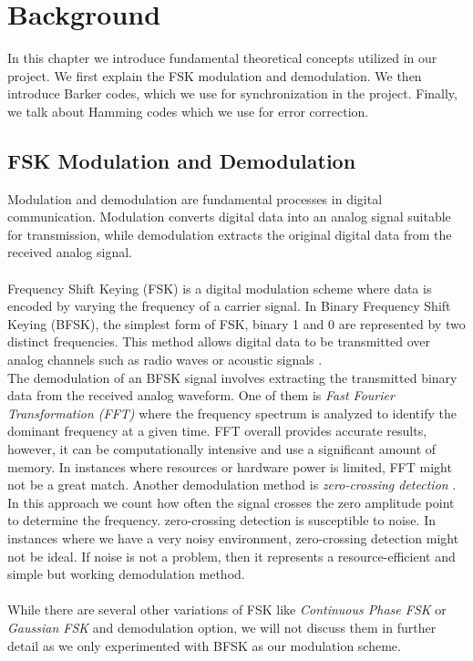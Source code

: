 \chapter{Background}
In this chapter we introduce fundamental theoretical concepts utilized in our project. We first explain the FSK modulation and demodulation. We then introduce Barker codes, which we use for synchronization in the project. Finally, we talk about Hamming codes which we use for error correction.

\section{FSK Modulation and Demodulation}
Modulation and demodulation are fundamental processes in digital communication. Modulation converts digital data into an analog signal suitable for transmission, while demodulation extracts the original digital data from the received analog signal. 
\\\\
Frequency Shift Keying (FSK) is a digital modulation scheme where data is encoded by varying the frequency of a carrier signal. In Binary Frequency Shift Keying (BFSK), the simplest form of FSK, binary 1 and 0 are represented by two distinct frequencies. This method allows digital data to be transmitted over analog channels such as radio waves or acoustic signals \cite{watson1980fsk}.
\\ 
The demodulation of an BFSK signal involves extracting the transmitted binary data from the received analog waveform. One of them is \textit{Fast Fourier Transformation (FFT)} \cite{duhamel1990fast} where the frequency spectrum is analyzed to identify the dominant frequency at a given time. FFT overall provides accurate results, however, it can be computationally intensive and use a significant amount of memory. In instances where resources or hardware power is limited, FFT might not be a great match. Another demodulation method is \textit{zero-crossing detection} \cite{wall2003simple}. In this approach we count how often the signal crosses the zero amplitude point to determine the frequency. zero-crossing detection is susceptible to noise. In instances where we have a very noisy environment, zero-crossing detection might not be ideal. If noise is not a problem, then it represents a resource-efficient and simple but working demodulation method.
\\ \\
While there are several other variations of FSK like \textit{Continuous Phase FSK} or \textit{Gaussian FSK} \cite{couch2013digital} and demodulation option, we will not discuss them in further detail as we only experimented with BFSK as our modulation scheme.

